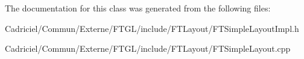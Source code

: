 The documentation for this class was generated from the following files\+:\begin{DoxyCompactItemize}
\item 
Cadriciel/\+Commun/\+Externe/\+F\+T\+G\+L/include/\+F\+T\+Layout/F\+T\+Simple\+Layout\+Impl.\+h\item 
Cadriciel/\+Commun/\+Externe/\+F\+T\+G\+L/include/\+F\+T\+Layout/F\+T\+Simple\+Layout.\+cpp\end{DoxyCompactItemize}
